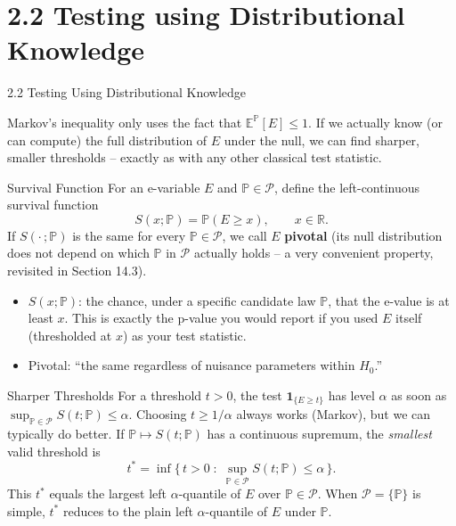 \documentclass[aspectratio=169,10pt]{beamer}
\newcommand{\PP}{\mathbb{P}}
\newcommand{\EE}{\mathbb{E}}
\newcommand{\RR}{\mathbb{R}}
\newcommand{\calP}{\mathcal{P}}
\newcommand{\ind}[1]{\mathbf{1}_{\{#1\}}}
\begin{document}
\section{2.2 Testing using Distributional Knowledge}

\begin{frame}[allowframebreaks]{2.2 Testing Using Distributional Knowledge}

Markov's inequality only uses the fact that $\EE^\PP[E]\le1$. If we actually
know (or can compute) the full distribution of $E$ under the null, we can
find sharper, smaller thresholds -- exactly as with any other classical test
statistic.

  \begin{block}{Survival Function}
    For an e-variable $E$ and $\PP \in \calP$, define the
    left-continuous survival function
    \[
      S(x;\PP) = \PP(E \ge x), \qquad x \in \RR.
    \]
    If $S(\cdot\,;\PP)$ is the same for every $\PP\in\calP$, we call $E$
    \textbf{pivotal} (its null distribution does not depend on which $\PP$
    in $\calP$ actually holds -- a very convenient property, revisited in
    Section 14.3).
  \end{block}

  \begin{itemize}
    \item $S(x;\PP)$: the chance, under a specific candidate law $\PP$, that
      the e-value is at least $x$. This is exactly the p-value you would
      report if you used $E$ itself (thresholded at $x$) as your test statistic.
    \item Pivotal: ``the same regardless of nuisance parameters within $H_0$.''
  \end{itemize}

  \begin{block}{Sharper Thresholds}
    For a threshold $t>0$, the test $\ind{E\ge t}$ has level $\alpha$ as soon
    as $\sup_{\PP\in\calP} S(t;\PP) \le \alpha$. Choosing $t\ge1/\alpha$
    always works (Markov), but we can typically do better. If
    $\PP\mapsto S(t;\PP)$ has a continuous supremum, the \emph{smallest}
    valid threshold is
    \[
      t^{*} = \inf\Big\{\, t>0 \;:\; \sup_{\PP\in\calP} S(t;\PP) \le \alpha \,\Big\}.
    \]
    This $t^{*}$ equals the largest left $\alpha$-quantile of $E$ over
    $\PP\in\calP$. When $\calP=\{\PP\}$ is simple, $t^{*}$ reduces to the
    plain left $\alpha$-quantile of $E$ under $\PP$.
  \end{block}


\end{frame}
\end{document}
